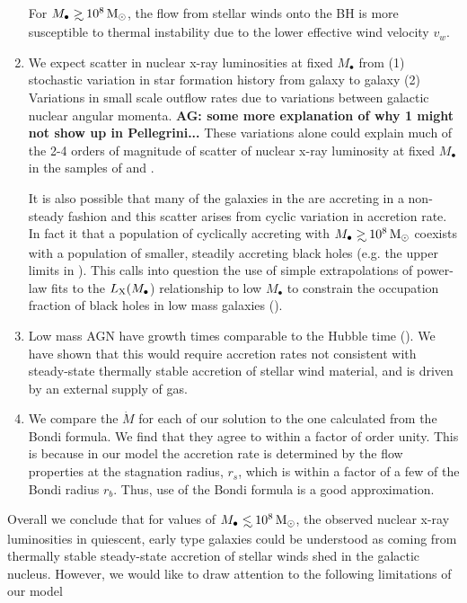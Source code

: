 \documentclass[usenatbib,fleqn]{mn2e}
\newcommand{\Mdot}{\dot{M}}
\newcommand\lsim{\mathrel{\rlap{\lower4pt\hbox{\hskip1pt$\sim$}}
    \raise1pt\hbox{$<$}}}
\newcommand\gsim{\mathrel{\rlap{\lower4pt\hbox{\hskip1pt$\sim$}}
    \raise1pt\hbox{$>$}}}
\newcommand{\rs}{r_s}
\newcommand{\rb}{r_b}
\newcommand{\Mbh}[1][]{M_{\bullet#1}}
\begin{document}
\begin{enumerate}
    For $\Mbh\gsim 10^8 \Msun$, the flow from stellar winds onto the
    BH is more susceptible to thermal instability due to the lower
    effective wind velocity $v_w$. 
  \item We expect scatter in nuclear x-ray luminosities at
    fixed $\Mbh$ from (1) stochastic variation in star formation
    history from galaxy to galaxy (2) Variations in small scale outflow
    rates due to variations between galactic nuclear angular
    momenta. {\bf AG: some more explanation of why 1 might not show up
    in Pellegrini...}
    These variations alone could explain much of the 2-4 orders of
    magnitude of scatter of nuclear x-ray luminosity at fixed $\Mbh$ 
    in the samples of \citet{Miller+15} and \citet{Pellegrini:2010a}.
    
    It is also possible that many of the galaxies in the
    \citet{Miller+15} are accreting in a non-steady fashion and this
    scatter arises from cyclic variation in accretion rate. In fact it
    that a population of cyclically accreting with $\Mbh\gsim 10^{8}
    \Msun$ coexists with a population of smaller, steadily accreting
    black holes (e.g. the upper limits in \citet{Miller+15}).  This
    calls into question the use of simple extrapolations of power-law
    fits to the $L_{\rm X}(M_{\bullet}$) relationship to low $M_{\bullet}$
    to constrain the occupation fraction of black holes in low mass
    galaxies (\citealt{Miller+15}).
  \item Low mass AGN have growth times comparable to the Hubble time
    (\citet{Heckman+04}). We have shown that this would require accretion
    rates not consistent with steady-state thermally stable accretion
    of stellar wind material, and is driven by an external supply of gas.
  \item We compare the $\Mdot$ for each of our solution to the one
    calculated from the Bondi formula. We find that they agree to
    within a factor of order unity. This is because in our model the
    accretion rate is determined by the flow properties at the
    stagnation radius, $\rs$, which is within a factor of a few of the
    Bondi radius $\rb$. Thus, use of the Bondi formula is a
    good approximation.
    \end{enumerate}
   
    Overall we conclude that for values of $\Mbh\lsim 10^{8} \Msun$,
    the observed nuclear x-ray luminosities in quiescent, early type
    galaxies could be understood as coming from thermally stable
    steady-state accretion of stellar winds shed in the galactic
    nucleus.  However, we would like to draw attention to the
    following limitations of our model
\end{document}
